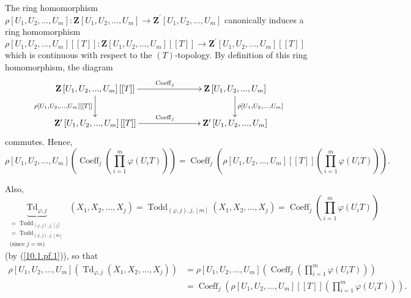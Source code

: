 \documentclass[numbers=enddot,12pt,final,onecolumn,notitlepage]{scrartcl}%
\begin{document}
The ring homomorphism $\rho\left[  U_{1},U_{2},...,U_{m}\right]
:\mathbf{Z}\left[  U_{1},U_{2},...,U_{m}\right]  \rightarrow\mathbf{Z}%
^{\prime}\left[  U_{1},U_{2},...,U_{m}\right]  $ canonically induces a ring
homomorphism $\rho\left[  U_{1},U_{2},...,U_{m}\right]  \left[  \left[
T\right]  \right]  :\mathbf{Z}\left[  U_{1},U_{2},...,U_{m}\right]  \left[
\left[  T\right]  \right]  \rightarrow\mathbf{Z}^{\prime}\left[  U_{1}%
,U_{2},...,U_{m}\right]  \left[  \left[  T\right]  \right]  $ which is
continuous with respect to the $\left(  T\right)  $-topology. By definition of
this ring homomorphism, the diagram%
\[
\xymatrixcolsep{6pc}\xymatrix{
\mathbf Z\left[U_1,U_2,...,U_m\right]\left[\left[T\right]\right] \ar[r]^{\operatorname*{Coeff}_j} \ar[d]_{\rho\left[U_1,U_2,...,U_m\right]\left[\left[T\right]\right]} & \mathbf Z\left[U_1,U_2,...,U_m\right] \ar[d]^{\rho\left[U_1,U_2,...,U_m\right]} \\
\mathbf Z^{\prime}\left[U_1,U_2,...,U_m\right]\left[\left[T\right]\right] \ar[r]^{\operatorname*{Coeff}_j} & \mathbf Z^{\prime}\left[U_1,U_2,...,U_m\right]
}
\]
commutes. Hence,
\[
\rho\left[  U_{1},U_{2},...,U_{m}\right]  \left(  \operatorname*{Coeff}%
\nolimits_{j}\left(  \prod\limits_{i=1}^{m}\varphi\left(  U_{i}T\right)
\right)  \right)  =\operatorname*{Coeff}\nolimits_{j}\left(  \rho\left[
U_{1},U_{2},...,U_{m}\right]  \left[  \left[  T\right]  \right]  \left(
\prod\limits_{i=1}^{m}\varphi\left(  U_{i}T\right)  \right)  \right)  .
\]


Also,
\[
\underbrace{\operatorname*{Td}\nolimits_{\varphi,j}}%
_{\substack{=\operatorname*{Todd}\nolimits_{\left(  \varphi,j\right)
,j,\left[  j\right]  }\\=\operatorname*{Todd}\nolimits_{\left(  \varphi
,j\right)  ,j,\left[  m\right]  }\\\text{(since }j=m\text{)}}}\left(
X_{1},X_{2},...,X_{j}\right)  =\operatorname*{Todd}\nolimits_{\left(
\varphi,j\right)  ,j,\left[  m\right]  }\left(  X_{1},X_{2},...,X_{j}\right)
=\operatorname*{Coeff}\nolimits_{j}\left(  \prod\limits_{i=1}^{m}%
\varphi\left(  U_{i}T\right)  \right)
\]
(by (\ref{10.1.pf.1})), so that%
\begin{align}
\rho\left[  U_{1},U_{2},...,U_{m}\right]  \left(  \operatorname*{Td}%
\nolimits_{\varphi,j}\left(  X_{1},X_{2},...,X_{j}\right)  \right)   &
=\rho\left[  U_{1},U_{2},...,U_{m}\right]  \left(  \operatorname*{Coeff}%
\nolimits_{j}\left(  \prod\limits_{i=1}^{m}\varphi\left(  U_{i}T\right)
\right)  \right) \nonumber\\
&  =\operatorname*{Coeff}\nolimits_{j}\left(  \rho\left[  U_{1},U_{2}%
,...,U_{m}\right]  \left[  \left[  T\right]  \right]  \left(  \prod
\limits_{i=1}^{m}\varphi\left(  U_{i}T\right)  \right)  \right)  .
\label{10.21.pf.3}%
\end{align}
\end{document}
